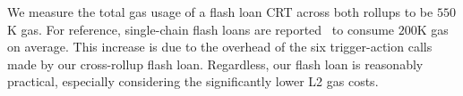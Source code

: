 We measure the total gas usage of a flash loan CRT across both rollups to be $550$K gas. For reference, single-chain flash loans are reported~\cite{equalizer-fl-cost} to consume $200$K gas on average. This increase is due to the overhead of the six trigger-action calls made by our cross-rollup flash loan. Regardless, our flash loan is reasonably practical, especially considering the significantly lower L2 gas costs. 
